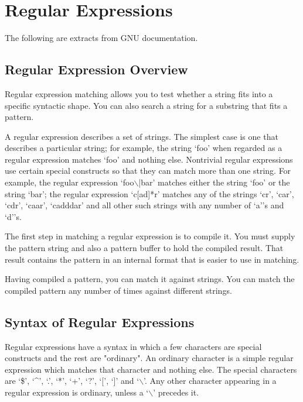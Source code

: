 \chapter{Regular Expressions}\label{regularexpressions}
%
\setfooter{\thepage}{}{}{}{}{\thepage}
The following are extracts from GNU documentation.

\section{Regular Expression Overview}

Regular expression matching allows you to test whether a string fits
into a specific syntactic shape. You can also search a string for a
substring that fits a pattern.

A regular expression describes a set of strings. The simplest case
is one that describes a particular string; for example, the string
`foo' when regarded as a regular expression matches `foo' and nothing
else. Nontrivial regular expressions use certain special constructs
so that they can match more than one string. For example, the
regular expression `foo$\backslash$|bar' matches either the string `foo' or the
string `bar'; the regular expression `c[ad]*r' matches any of the
strings `cr', `car', `cdr', `caar', `cadddar' and all other such
strings with any number of `a''s and `d''s.

The first step in matching a regular expression is to compile it. 
You must supply the pattern string and also a pattern buffer to hold
the compiled result. That result contains the pattern in an internal
format that is easier to use in matching.

Having compiled a pattern, you can match it against strings. You can
match the compiled pattern any number of times against different
strings.

\section{Syntax of Regular Expressions}

Regular expressions have a syntax in which a few characters are
special constructs and the rest are "ordinary". An ordinary
character is a simple regular expression which matches that character
and nothing else. The special characters are `\$', `^', `.', `*',
`+', `?', `[', `]' and `$\backslash$'. Any other character appearing in a
regular expression is ordinary, unless a `$\backslash$' precedes it.

